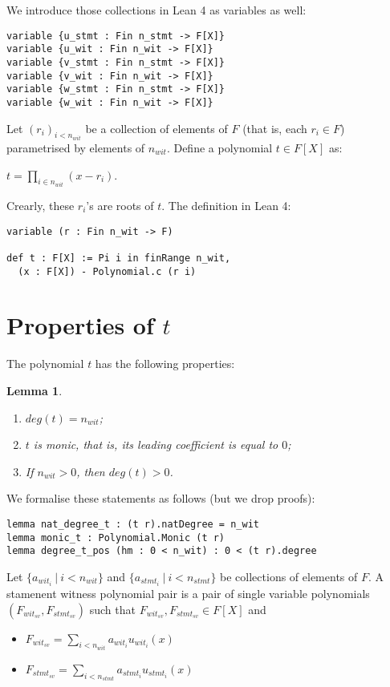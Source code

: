 \documentclass{article}
\newtheorem{lemma}{Lemma}
\theoremstyle{definition}
\theoremstyle{remark}
\begin{document}
We introduce those collections in Lean 4 as variables as well:

\begin{lstlisting}
variable {u_stmt : Fin n_stmt -> F[X]}
variable {u_wit : Fin n_wit -> F[X]}
variable {v_stmt : Fin n_stmt -> F[X]}
variable {v_wit : Fin n_wit -> F[X]}
variable {w_stmt : Fin n_stmt -> F[X]}
variable {w_wit : Fin n_wit -> F[X]}
\end{lstlisting}

Let $(r_i)_{i < n_{wit}}$ be a collection of elements of $F$ (that is, each $r_i \in F$) parametrised by elements of $n_{wit}$. Define a polynomial $t \in F[X]$ as:
\begin{center}
$t = \prod \limits_{i \in n_{wit}} (x - r_i)$.
\end{center}

Crearly, these $r_i$'s are roots of $t$. The definition in Lean 4:
\begin{lstlisting}
variable (r : Fin n_wit -> F)

def t : F[X] := Pi i in finRange n_wit,
  (x : F[X]) - Polynomial.c (r i)
\end{lstlisting}

\section{Properties of $t$}

The polynomial $t$ has the following properties:

\begin{lemma}
$ $

\begin{enumerate}
\item $deg(t) = n_{wit}$;
\item $t$ is monic, that is, its leading coefficient is equal to $0$;
\item If $n_{wit} > 0$, then $deg(t) > 0$.
\end{enumerate}
\end{lemma}

We formalise these statements as follows (but we drop proofs):
\begin{lstlisting}
lemma nat_degree_t : (t r).natDegree = n_wit
lemma monic_t : Polynomial.Monic (t r)
lemma degree_t_pos (hm : 0 < n_wit) : 0 < (t r).degree
\end{lstlisting}

Let $\{ a_{{wit}_i} \: | \: i < n_{wit}\}$ and $\{ a_{{stmt}_i} \: | \: i < n_{stmt} \}$ be collections of elements of $F$. A stamenent witness polynomial pair is a pair of single variable polynomials $(F_{{wit}_{sv}}, F_{{stmt}_{sv}})$
such that $F_{{wit}_{sv}}, F_{{stmt}_{sv}} \in F[X]$ and
\begin{itemize}
\item $F_{{wit}_{sv}} = \sum \limits_{i < n_{wit}} a_{{wit}_i} u_{{wit}_{i}}(x)$
\item $F_{{stmt}_{sv}} = \sum \limits_{i < n_{stmt}} a_{{stmt}_i} u_{{stmt}_{i}}(x)$
\end{itemize}
\end{document}
